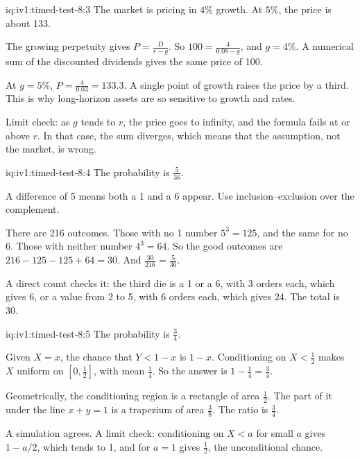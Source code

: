 \begin{solution}{iq:iv1:timed-test-8:3}
The market is pricing in $4\%$ growth. At $5\%$, the price is about 133.

The growing perpetuity gives $P = \frac{D}{r - g}$. So $100 = \frac{4}{0.08 - g}$, and $g = 4\%$. A numerical sum of the discounted dividends gives the same price of 100.

At $g = 5\%$, $P = \frac{4}{0.03} = 133.3$. A single point of growth raises the price by a third. This is why long-horizon assets are so sensitive to growth and rates.

Limit check: as $g$ tends to $r$, the price goes to infinity, and the formula fails at or above $r$. In that case, the sum diverges, which means that the assumption, not the market, is wrong.

\end{solution}

\begin{solution}{iq:iv1:timed-test-8:4}
The probability is $\frac{5}{36}$.

A difference of 5 means both a 1 and a 6 appear. Use inclusion--exclusion over the complement.

There are 216 outcomes. Those with no 1 number $5^3 = 125$, and the same for no 6. Those with neither number $4^3 = 64$. So the good outcomes are $216 - 125 - 125 + 64 = 30$. And $\frac{30}{216} = \frac{5}{36}$.

A direct count checks it: the third die is a 1 or a 6, with 3 orders each, which gives 6, or a value from 2 to 5, with 6 orders each, which gives 24. The total is 30.

\end{solution}

\begin{solution}{iq:iv1:timed-test-8:5}
The probability is $\frac34$.

Given $X = x$, the chance that $Y < 1 - x$ is $1 - x$. Conditioning on $X < \frac12$ makes $X$ uniform on $[0, \frac12]$, with mean $\frac14$. So the answer is $1 - \frac14 = \frac34$.

Geometrically, the conditioning region is a rectangle of area $\frac12$. The part of it under the line $x + y = 1$ is a trapezium of area $\frac38$. The ratio is $\frac34$.

A simulation agrees. A limit check: conditioning on $X < a$ for small $a$ gives $1 - a/2$, which tends to 1, and for $a = 1$ gives $\frac12$, the unconditional chance.

\end{solution}

